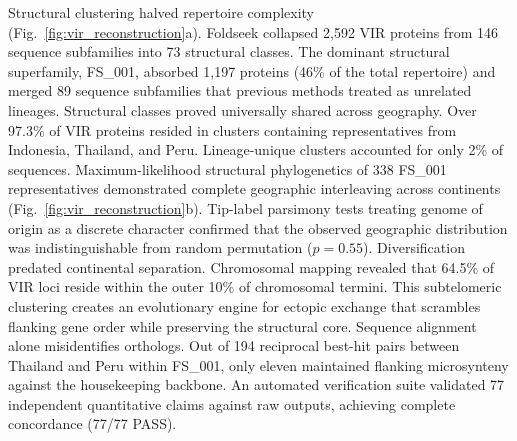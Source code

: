 \documentclass[11pt,letterpaper]{article}
\begin{document}
Structural clustering halved repertoire complexity (Fig.~\ref{fig:vir_reconstruction}a). Foldseek collapsed 2,592 VIR proteins from 146 sequence subfamilies into 73 structural classes. The dominant structural superfamily, FS\_001, absorbed 1,197 proteins (46\% of the total repertoire) and merged 89 sequence subfamilies that previous methods treated as unrelated lineages. Structural classes proved universally shared across geography. Over 97.3\% of VIR proteins resided in clusters containing representatives from Indonesia, Thailand, and Peru. Lineage-unique clusters accounted for only 2\% of sequences. Maximum-likelihood structural phylogenetics of 338 FS\_001 representatives demonstrated complete geographic interleaving across continents (Fig.~\ref{fig:vir_reconstruction}b). Tip-label parsimony tests treating genome of origin as a discrete character confirmed that the observed geographic distribution was indistinguishable from random permutation ($p = 0.55$). Diversification predated continental separation. Chromosomal mapping revealed that 64.5\% of VIR loci reside within the outer 10\% of chromosomal termini. This subtelomeric clustering creates an evolutionary engine for ectopic exchange that scrambles flanking gene order while preserving the structural core. Sequence alignment alone misidentifies orthologs. Out of 194 reciprocal best-hit pairs between Thailand and Peru within FS\_001, only eleven maintained flanking microsynteny against the housekeeping backbone. An automated verification suite validated 77 independent quantitative claims against raw outputs, achieving complete concordance (77/77 PASS).
\end{document}
